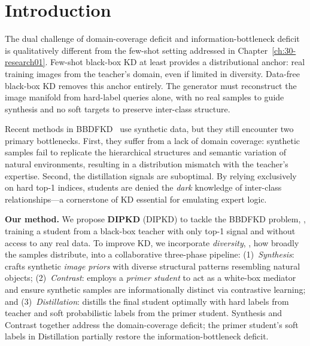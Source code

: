 \section{Introduction} \label{sec:41-research02-introduction}

\begin{foldable}
  The dual challenge of domain-coverage deficit and information-bottleneck deficit is qualitatively different from the few-shot setting addressed in Chapter~\ref{ch:30-research01}.
  Few-shot black-box \ac{KD} at least provides a distributional anchor: real training images from the teacher's domain, even if limited in diversity.
  Data-free black-box \ac{KD} removes this anchor entirely.
  The generator must reconstruct the image manifold from hard-label queries alone, with no real samples to guide synthesis and no soft targets to preserve inter-class structure.
\end{foldable}

\begin{foldable} %
  Recent methods in BBDFKD~\cite{wang2021zero,zhang2022ideal,yuan2024data} use synthetic data, but they still encounter two primary bottlenecks.
  First, they suffer from a lack of domain coverage: synthetic samples fail to replicate the hierarchical structures and semantic variation of natural environments, resulting in a distribution mismatch with the teacher's expertise.
  Second, the distillation signals are suboptimal.
  By relying exclusively on hard top-1 indices, students are denied the \textit{dark} knowledge of inter-class relationships---a cornerstone of \ac{KD} essential for emulating expert logic.
\end{foldable}

\begin{foldable} %
  \textbf{Our method.} We propose \textbf{\acl{DIPKD}} (\acs{DIPKD}) to tackle the BBDFKD problem, \ie, training a student from a black-box teacher with only top-1 signal and without access to any real data.
  To improve \ac{KD}, we incorporate \textit{diversity}, \ie, how broadly the samples distribute, into a collaborative three-phase pipeline:{
    (1)~\textit{Synthesis}: crafts synthetic \textit{image priors} with diverse structural patterns resembling natural objects;
    (2)~\textit{Contrast}: employs a \textit{primer student} to act as a white-box mediator and ensure synthetic samples are informationally distinct via contrastive learning;
    and (3)~\textit{Distillation}: distills the final student optimally with hard labels from teacher and soft probabilistic labels from the primer student.
  }
  Synthesis and Contrast together address the domain-coverage deficit; the primer student's soft labels in Distillation partially restore the information-bottleneck deficit.
\end{foldable}

